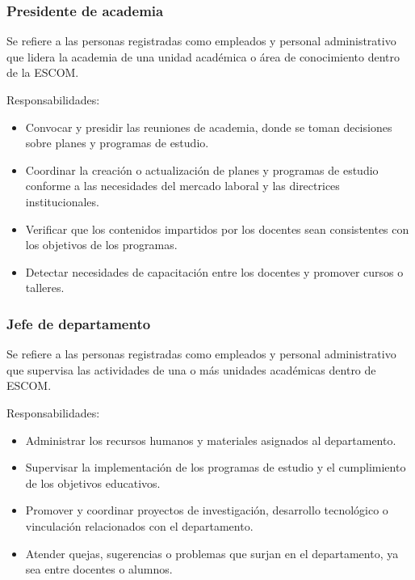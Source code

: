 \begin{Usuario}{\hypertarget{tPresidente}{\subsubsection{Presidente de academia}}}{
Se refiere a las personas registradas como empleados y personal administrativo que lidera la academia de una unidad académica o área de conocimiento dentro de la ESCOM.
}
\item[Responsabilidades:] \cdtEmpty
\begin{itemize}
    \item Convocar y presidir las reuniones de academia, donde se toman decisiones sobre planes y programas de estudio.
    \item Coordinar la creación o actualización de planes y programas de estudio conforme a las necesidades del mercado laboral y las directrices institucionales.
    \item Verificar que los contenidos impartidos por los docentes sean consistentes con los objetivos de los programas.
    \item Detectar necesidades de capacitación entre los docentes y promover cursos o talleres. 
\end{itemize}
\end{Usuario}

\begin{Usuario}{\hypertarget{tJefe}{\subsubsection{Jefe de departamento}}}{
Se refiere a las personas registradas como empleados y personal administrativo que supervisa las actividades de una o más unidades académicas dentro de ESCOM.
}
\item[Responsabilidades:] \cdtEmpty
\begin{itemize}
\item Administrar los recursos humanos y materiales asignados al departamento.
\item Supervisar la implementación de los programas de estudio y el cumplimiento de los objetivos educativos.
\item Promover y coordinar proyectos de investigación, desarrollo tecnológico o vinculación relacionados con el departamento.
\item Atender quejas, sugerencias o problemas que surjan en el departamento, ya sea entre docentes o alumnos.
\end{itemize}
\end{Usuario}



